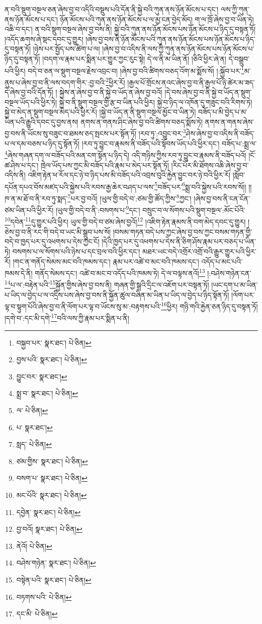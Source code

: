 ན་བའི་སྡུག་བསྔལ་ཅན་ཞེས་བྱ་བ་འདིའི་བསྡུས་པའི་དོན་ནི་སྐྱེ་བའི་ཀུན་ནས་ཉོན་མོངས་པ་དང་། ལས་ཀྱི་ཀུན་ནས་ཉོན་མོངས་པ་དང་། ཉོན་མོངས་པའི་ཀུན་ནས་ཉོན་མོངས་པ་ལ་མྱ་ངན་བྱེད་མོད། ག་ལ་ཁྲོ་ཞེས་བྱ་བ་ཡིན་ཏེ། འཆི་བ་དང་། ན་བའི་སྡུག་བསྔལ་ཞེས་བྱ་བས་ནི། སྐྱེ་བའི་ཀུན་ནས་ཉོན་མོངས་པས་ཉོན་མོངས་པ་ཉིད་དུ་བསྟན་ཏོ། །འདོད་ཆགས་ཞེ་སྡང་དབང་དུ་གྱུར། །ཞེས་བྱ་བས་ནི་ཉོན་མོངས་པའི་ཀུན་ནས་ཉོན་མོངས་པས་ཉོན་མོངས་པ་ཉིད་དུ་བསྟན་ཏོ། །ཉེས་པར་སྤྱོད་པས་ཚིག་པ་ལ། །ཞེས་བྱ་བ་འདིས་ནི་ལས་ཀྱི་ཀུན་ནས་ཉོན་མོངས་པས་ཉོན་མོངས་པ་ཉིད་དུ་བསྟན་ཏོ། །བདག་ལ་རྣམ་པར་སྨིན་པར་གྱུར་ཀྱང་རུང་སྟེ། དེ་ལ་ནི་མ་ཡིན་ནོ། །ཅིའི་ཕྱིར་ཞེ་ན། དེ་བསྒྲུབ་པའི་ཕྱིར། བདེ་བ་ཅན་ལ་སྡུག་བསྔལ་རྗེས་འབྲང་བ། །ཞེས་བྱ་བའི་ཚིགས་བཅད་འོག་མ་སྨོས་སོ། །:སྐྱོབ་པར་\footnote{བསྐྱབ་པར་  སྣར་ཐང་།  པེ་ཅིན། }མ་ནུས་པ་ཞེས་བྱ་བ་ནི་ལས་བདག་གིར་:བྱ་བའི་\footnote{བྱས་པའི་  སྣར་ཐང་།  པེ་ཅིན། }ཕྱིར་རོ། །རྒྱལ་པོ་གྲོངས་ནའང་ཞེས་བྱ་བ་ནི་རྒྱལ་པོ་ཉི་ཚེར་མ་ཟད་དེ་ཞེས་བྱ་བའི་དོན་ཏོ། །
སྐྱེས་ན་ཞེས་བྱ་བ་ནི་སྐྱེ་བ་ཡོད་ན་ཞེས་བྱ་བའོ། །དེ་བས་ཞེས་བྱ་བ་ནི་སྐྱེ་བ་ཡོད་ན་སྡུག་བསྔལ་ཡོད་པའི་ཕྱིར་ཏེ། སྐྱེ་བ་ནི་སྡུག་བསྔལ་གྱི་རྩ་བ་ཡིན་པའི་ཕྱིར། སྐྱེ་བ་ཉིད་ལ་འཁོན་དུ་གཟུང་བའི་རིགས་ཏེ། སྐྱེ་བ་མེད་ན་སྡུག་བསྔལ་མེད་པའི་ཕྱིར་རོ། །སྐྱེ་བ་ཡོད་ན་ནི་སྡུག་བསྔལ་མྱོང་བ་ཡིན་ཏེ། བཟོད་པ་མི་བྱེད་པ་མ་ཡིན་པའི་རྒྱུའི་དབང་དུ་བྱས་ནས། ནགས་ན་གནས་ཤིང་ཞེས་བྱ་བའི་ཚིགས་བཅད་སྨོས་ཏེ། ནགས་ན་གནས་ཞེས་བྱ་བས་ནི་ཡོངས་སུ་བཟུང་བ་ཐམས་ཅད་སྤངས་པར་སྟོན་ཏོ། །རབ་ཏུ་:འབྱུང་བར་\footnote{བྱུང་བར་  སྣར་ཐང་། }ཤེས་ཞེས་བྱ་བ་འདིས་ནི་བཟོད་པ་ལ་དམ་བཅས་པ་ཉིད་དུ་སྟོན་ཏོ། །རབ་ཏུ་བྱུང་བ་རྣམས་ནི་བཟོད་པའི་སྟོབས་ཡོད་པའི་ཕྱིར་དང་། བཟོད་པ་:སྨྲ་ལ་\footnote{སྨྲ་བ་  སྣར་ཐང་།  པེ་ཅིན། }ཞེས་གཞན་དག་ལ་བཟོད་པའི་མན་ངག་སྟོན་པ་ཉིད་དེ། འདི་གཉིས་ཀྱིས་རབ་ཏུ་བྱུང་བ་རྣམས་ནི་བཟོད་པའོ། །ངོ་ཚ་ཤེས་པ་དང་། ཁྲེལ་ཡོད་པས་ཀྱང་མི་བཟོད་པའི་རྣམ་པ་མེད་པར་སྟོན་ཏོ། །རིང་པོར་མི་ཐོགས་འཆི་ཞེས་བྱ་བ་འདིས་ནི། འཇིག་རྟེན་ཕ་རོལ་དང་ཉེ་བ་ཉིད་པས་མི་བཟོད་པའི་འབྲས་བུའི་རྐྱེན་བྱུང་བར་ཉེ་བའི་ཕྱིར་རོ། །སློབ་དཔོན་དཔའ་བོས་མཛད་པའི་སྐྱེས་པའི་རབས་རྒྱ་ཆེར་བཤད་པ་ལས་\footnote{ལ་  པེ་ཅིན། }བཟོད་པར་\footnote{པ་  སྣར་ཐང་། }སྨྲ་བའི་སྐྱེས་པའི་རབས་སོ།། །།ཁ་ན་མ་ཐོ་བ་ནི་རབ་ཏུ་སྨད་\footnote{སླད་  པེ་ཅིན། }པར་བྱ་བའོ། །ཡུལ་གྱི་བདེ་བ་:ཙམ་གྱི་ཚོད་ཀྱིས་\footnote{ཙམ་གྱིས་  སྣར་ཐང་།  པེ་ཅིན། }ཀྱང་། །ཞེས་བྱ་བས་ནི་ངན་ངོན་ཙམ་ཡིན་པའི་ཕྱིར་རོ། །ཡུལ་གྱི་བདེ་བ་ནི་:བསགས་པ་\footnote{བསག་པ་  སྣར་ཐང་།  པེ་ཅིན། }དང་། བསྲུང་བ་ལ་སོགས་པའི་སྡུག་བསྔལ་:མོང་པོའི་\footnote{མང་པོའི་  སྣར་ཐང་།  པེ་ཅིན། }དབེན་\footnote{དབྱེན་  སྣར་ཐང་།  པེ་ཅིན། }དུ་གྱུར་པའི་ཕྱིར། ཡུལ་གྱི་བདེ་བ་ཙམ་ཞེས་བྱའོ།\footnote{བྱ་བའོ།  སྣར་ཐང་།  པེ་ཅིན། } །འཇིག་རྟེན་རྣམས་ནི་བག་མེད་དབང་དུ་གྱུར། །ཅེས་བྱ་བ་ནི་རང་གི་བདེ་བ་ཡང་མི་སྒྲུབ་པས་སོ། །བསམ་གཏན་བདེ་པས་ཀྱང་ཞེས་བྱ་བས་ཀྱང་བསམ་གཏན་གྱི་བདེ་བ་ཁྱད་པར་དུ་འཕགས་པ་དེས་ཀྱང་ངོ། །དེའི་ཁྱད་པར་དུ་འཕགས་པ་དེས་ནི་ཅིག་ཤོས་རྣམ་པར་བཅད་པ་ཡིན་ཏེ། བསགས་པ་ལ་སོགས་པའི་ཉེས་པ་དང་བྲལ་བའི་ཕྱིར་དང་། མཐར་ཡང་བདེ་འགྲོར་འགྲོ་བའི་རྒྱུར་གྱུར་པའི་ཕྱིར་རོ། །གང་ན་གནོད་སེམས་མང་བའི་ཁམས་དང་། རྣམ་པར་འཚེ་བ་མང་བའི་ཁམས་དང་། འདོད་པ་མང་པའི་ཁམས་དེ་ནི། གནོད་སེམས་དང་། འཚེ་བ་མང་བ་འདོད་པའི་ཁམས་ཏེ། དེ་ལ་བལྟས་ནའོ།\footnote{ནེའོ།  པེ་ཅིན། } །:བཤེས་གཉེན་ངན་\footnote{བཤེས་གཉེན་  སྣར་ཐང་།  པེ་ཅིན། }པ་ལ་:བརྟེན་པའི་\footnote{བསྟེན་པའི་  སྣར་ཐང་།  པེ་ཅིན། }སྐྱོན་གྱིས་ཞེས་བྱ་བས་ནི། གཞན་གྱི་སྒྲའི་དྲིང་ལ་འཇོག་པར་བསྟན་ཏོ། །ཡང་དག་པ་མ་ཡིན་པ་ཡིད་ལ་བྱེད་པ་ལ་འདྲིས་པས་ཞེས་བྱ་བས་ནི་སྐྱོན་ཚུལ་བཞིན་མ་ཡིན་པ་ཡིད་ལ་བྱེད་པ་ཉིད་སྟོན་ཏོ། །ལོག་པར་ལྟ་བ་སྟུག་པོའི་ཞེས་བྱ་བ་ནི་ལོག་པར་ལྟ་བ་ཡོངས་སུ་མ་:བརྟགས་པའི་\footnote{བཏགས་པའི་  པེ་ཅིན། }ཕྱིར། གཉི་གའི་རྐྱེན་ཅན་ཉིད་དུ་བསྟན་ཏོ། །དགེ་བ་:དང་མི་དགེ་\footnote{དང་མི་  པེ་ཅིན། }བའི་ལས་ཀྱི་རྣམ་པར་སྨིན་པ་ནི། 